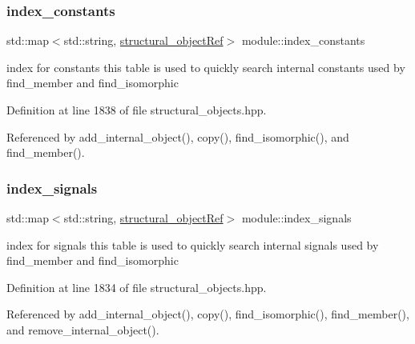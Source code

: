 \subsubsection{\texorpdfstring{index\+\_\+constants}{index\_constants}}
{\footnotesize\ttfamily std\+::map$<$std\+::string, \hyperlink{structural__objects_8hpp_a8ea5f8cc50ab8f4c31e2751074ff60b2}{structural\+\_\+object\+Ref}$>$ module\+::index\+\_\+constants\hspace{0.3cm}{\ttfamily [private]}}



index for constants this table is used to quickly search internal constants used by find\+\_\+member and find\+\_\+isomorphic 



Definition at line 1838 of file structural\+\_\+objects.\+hpp.



Referenced by add\+\_\+internal\+\_\+object(), copy(), find\+\_\+isomorphic(), and find\+\_\+member().

\mbox{\label{classmodule_af76f32a88cc575505605cc7bef4c4d49}} 
\subsubsection{\texorpdfstring{index\+\_\+signals}{index\_signals}}
{\footnotesize\ttfamily std\+::map$<$std\+::string, \hyperlink{structural__objects_8hpp_a8ea5f8cc50ab8f4c31e2751074ff60b2}{structural\+\_\+object\+Ref}$>$ module\+::index\+\_\+signals\hspace{0.3cm}{\ttfamily [private]}}



index for signals this table is used to quickly search internal signals used by find\+\_\+member and find\+\_\+isomorphic 



Definition at line 1834 of file structural\+\_\+objects.\+hpp.



Referenced by add\+\_\+internal\+\_\+object(), copy(), find\+\_\+isomorphic(), find\+\_\+member(), and remove\+\_\+internal\+\_\+object().

\mbox{\label{classmodule_af6bb82c274a7f59e1238a5b5eb549898}} 
